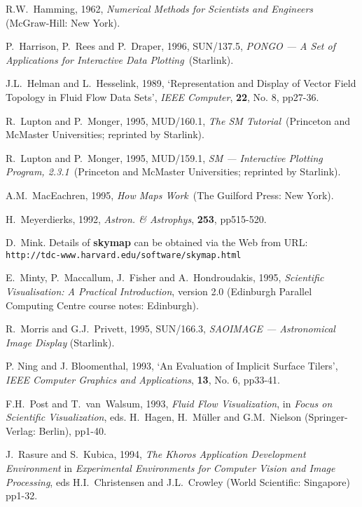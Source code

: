 \begin{thebibliography}{99}
   R.W.~Hamming, 1962, {\it Numerical Methods for
   Scientists and Engineers}\, (McGraw-Hill: New York).

   P.~Harrison, P.~Rees and P.~Draper, 1996, SUN/137.5,
   {\it PONGO --- A Set of Applications for Interactive Data Plotting}\,
   (Starlink).

   J.L.~Helman and L.~Hesselink, 1989, 
   `Representation and Display of Vector Field Topology in Fluid Flow
   Data Sets', {\it IEEE Computer}, {\bf 22}, No. 8, pp27-36.

   R.~Lupton and P.~Monger, 1995, MUD/160.1, {\it
   The SM Tutorial}\, (Princeton and McMaster Universities; reprinted
   by Starlink).

   R.~Lupton and P.~Monger, 1995, MUD/159.1, {\it
   SM --- Interactive Plotting Program, 2.3.1}\, (Princeton and McMaster
   Universities; reprinted by Starlink).

   A.M.~MacEachren, 1995, {\it How Maps Work}\,
   (The Guilford Press: New York).

   H.~Meyerdierks, 1992, {\it Astron. \& Astrophys},
   {\bf 253}, pp515-520.

   D.~Mink. Details of {\bf skymap} can be obtained
   via the Web from URL:
   {\tt http://tdc-www.harvard.edu/software/skymap.html}

   E.~Minty, P.~Maccallum, J.~Fisher and
   A.~Hondroudakis, 1995, {\it Scientific Visualisation: A Practical
   Introduction}, version 2.0 (Edinburgh Parallel Computing Centre
   course notes: Edinburgh).

   R.~Morris and G.J.~Privett, 1995, SUN/166.3, 
   {\it SAOIMAGE --- Astronomical Image Display} (Starlink).

   P. Ning and J. Bloomenthal, 1993, `An Evaluation of
   Implicit Surface Tilers', {\it IEEE Computer Graphics and
   Applications}, {\bf 13}, No. 6, pp33-41.

   F.H.~Post and T.~van~Walsum, 1993, {\it Fluid Flow
   Visualization}, in {\it Focus on Scientific Visualization}, eds.
   H.~Hagen, H.~M\"{u}ller and G.M.~Nielson (Springer-Verlag: Berlin),
   pp1-40.

   J.~Rasure and S.~Kubica, 1994, {\it The Khoros Application
   Development Environment} in {\it Experimental Environments for
   Computer Vision and Image Processing}, eds H.I.~Christensen and
   J.L.~Crowley (World Scientific: Singapore)  pp1-32.


\end{thebibliography}
